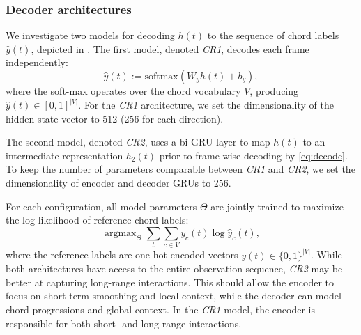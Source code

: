\documentclass{article}
\DeclareMathOperator*{\argmax}{argmax}
\begin{document}
\subsubsection{Decoder architectures}
We investigate two models for decoding $h(t)$ to the sequence of chord labels $\hat{y}(t)$, depicted in .
The first model, denoted \emph{CR1}, decodes each frame independently:
\begin{equation}
    \hat{y}(t) := \text{softmax}\left(W_y h(t) + b_y\right),\label{eq:decode}
\end{equation}
where the soft-max operates over the chord vocabulary $V$, producing $\hat{y}(t) \in {[0,1]}^{|V|}$.
For the \emph{CR1} architecture, we set the dimensionality of the hidden state vector to 512 (256 for each direction).

The second model, denoted \emph{CR2}, uses a bi-GRU layer to map $h(t)$ to an intermediate representation $h_2(t)$ prior to frame-wise decoding by \cref{eq:decode}.
To keep the number of parameters comparable between \emph{CR1} and \emph{CR2}, we set the dimensionality of encoder and decoder GRUs to 256.

For each configuration, all model parameters $\Theta$ are jointly trained to maximize the log-likelihood of reference chord labels:
\begin{equation}
\argmax_\Theta    \sum_t \sum_{c \in V} y_c(t) \log \hat{y}_c(t),
\end{equation}
where the reference labels are one-hot encoded vectors $y(t) \in {\{0,1\}}^{|V|}$.
While both architectures have access to the entire observation sequence, \emph{CR2} may be better at capturing long-range interactions.
This should allow the encoder to focus on short-term smoothing and local context, while the decoder can model chord progressions and global context.
In the \emph{CR1} model, the encoder is responsible for both short- and long-range interactions.
\end{document}
